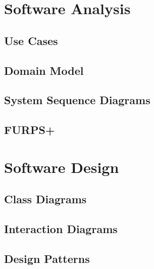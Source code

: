 \documentclass[a4paper,11pt]{article}
\begin{document}
\pagebreak
\section{Software Analysis}


\subsection{Use Cases}


\subsection{Domain Model}


\subsection{System Sequence Diagrams}


\subsection{FURPS+}


\pagebreak
\section{Software Design}


\subsection{Class Diagrams}


\subsection{Interaction Diagrams}


\subsection{Design Patterns}



\pagebreak
\end{document}
